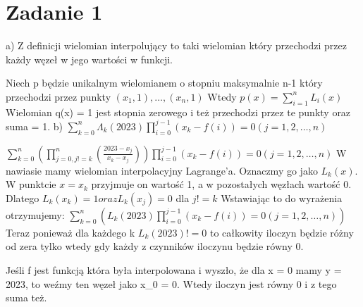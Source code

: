 \documentclass[12pt]{article}
\begin{document}
\bgroup\obeylines
\section{Zadanie 1}
a)
Z definicji wielomian interpolujący to taki wielomian który przechodzi przez każdy węzeł w jego wartości w funkcji.

Niech p będzie unikalnym wielomianem o stopniu maksymalnie n-1 który przechodzi przez punkty $(x_1, 1), \dots, (x_n, 1)$ Wtedy $p(x) = \sum_{i=1}^{n} L_i(x)$
Wielomian q(x) = 1 jest stopnia zerowego i też przechodzi przez te punkty oraz suma = 1.
b)
$\sum_{k=0}^n \Lambda_k(2023) \prod_{i=0}^{j-1}(x_k - f(i)) = 0 (j = 1, 2, \dots, n)$

$\sum_{k=0}^n (\prod_{j=0, j!=k}^{n} (\frac{2023-x_j}{x_k-x_j})) \prod_{i=0}^{j-1}(x_k - f(i)) = 0 (j = 1, 2, \dots, n)$
W nawiasie mamy wielomian interpolacyjny Lagrange'a. Oznaczmy go jako $L_k(x)$. W punktcie $x = x_k$ przyjmuje on wartość 1, a w pozostałych węzłach wartość 0. Dlatego
$L_k(x_k) = 1 oraz L_k(x_j) = 0$ dla $j != k$
Wstawiając to do wyrażenia otrzymujemy:
$\sum_{k=0}^n (L_k(2023) \prod_{i=0}^{j-1}(x_k - f(i)) = 0 (j = 1, 2, \dots, n))$
Teraz ponieważ dla każdego k $L_k(2023) != 0$ to całkowity iloczyn będzie różny od zera tylko wtedy gdy każdy z czynników iloczynu będzie równy 0.

Jeśli f jest funkcją która była interpolowana i wyszło, że dla x = 0 mamy y = 2023, to weźmy ten węzeł jako x_0 = 0. Wtedy iloczyn jest równy 0 i z tego suma też. 







\egroup
\end{document}
